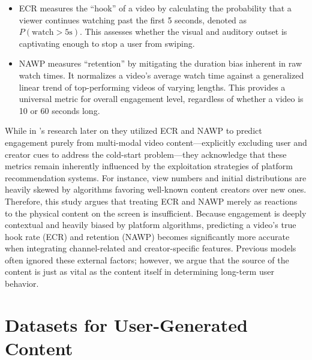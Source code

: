     \begin{itemize}
        \item ECR measures the ``hook'' of a video by calculating the probability that a viewer continues watching past the first 5 seconds, denoted as $P(\text{watch} > 5\text{s})$. This assesses whether the visual and auditory outset is captivating enough to stop a user from swiping.
    \end{itemize}
    
    \begin{itemize}
        \item NAWP measures ``retention'' by mitigating the duration bias inherent in raw watch times. It normalizes a video's average watch time against a generalized linear trend of top-performing videos of varying lengths. This provides a universal metric for overall engagement level, regardless of whether a video is 10 or 60 seconds long.
    \end{itemize}
    

While in \citeauthor{li2025vquala}'s \citeyear{li2025vquala} research later on they utilized ECR and NAWP to predict engagement purely from multi-modal video content—explicitly excluding user and creator cues to address the cold-start problem—they acknowledge that these metrics remain inherently influenced by the exploitation strategies of platform recommendation systems. For instance, view numbers and initial distributions are heavily skewed by algorithms favoring well-known content creators over new ones. Therefore, this study argues that treating ECR and NAWP merely as reactions to the physical content on the screen is insufficient. Because engagement is deeply contextual and heavily biased by platform algorithms, predicting a video's true hook rate (ECR) and retention (NAWP) becomes significantly more accurate when integrating channel-related and creator-specific features. Previous models often ignored these external factors; however, we argue that the source of the content is just as vital as the content itself in determining long-term user behavior.



\section{Datasets for User-Generated Content}

